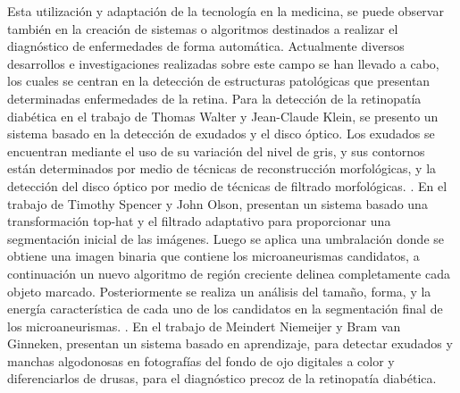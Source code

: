 Esta utilizaci\'on y adaptaci\'on de la tecnolog\'ia en la medicina, se puede observar tambi\'en en la creaci\'on de sistemas o algoritmos destinados a realizar el diagn\'ostico de enfermedades de forma autom\'atica. Actualmente diversos desarrollos e investigaciones realizadas sobre este campo se han llevado a cabo, los cuales se centran en la detecci\'on de estructuras patol\'ogicas que presentan determinadas enfermedades de la retina. 
Para la detecci\'on de la retinopat\'ia diab\'etica en el trabajo de Thomas Walter y Jean-Claude Klein, se presento un sistema basado en la detecci\'on de exudados y el disco \'optico. Los exudados se encuentran mediante el uso de su variaci\'on del nivel de gris, y sus contornos están determinados por medio de t\'ecnicas de reconstrucci\'on morfol\'ogicas, y la detecci\'on del disco \'optico por medio de t\'ecnicas de filtrado morfol\'ogicas. \cite{walter2002contribution}.  En el trabajo de Timothy Spencer y  John Olson, presentan un sistema basado una transformaci\'on top-hat y el filtrado adaptativo para proporcionar una segmentaci\'on inicial de las im\'agenes. Luego se aplica una umbralaci\'on donde se obtiene una imagen binaria que contiene los microaneurismas candidatos, a continuaci\'on un nuevo algoritmo de regi\'on creciente delinea completamente cada objeto marcado. Posteriormente se realiza un an\'alisis del tamaño, forma, y la energ\'ia caracter\'istica de cada uno de los candidatos en la segmentaci\'on final de los microaneurismas. \cite{spencer1996image} .  En el trabajo de Meindert Niemeijer y Bram van Ginneken, presentan un sistema basado en aprendizaje, para detectar exudados y manchas algodonosas en fotograf\'ias del fondo de ojo digitales a color y diferenciarlos de drusas, para el diagn\'ostico precoz de la retinopat\'ia diab\'etica.\cite{frame1998comparison} \cite{niemeijer2007automated}
